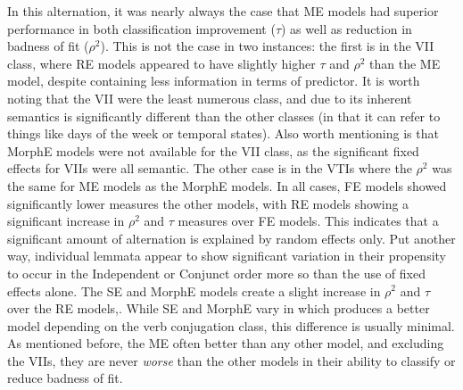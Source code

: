In this alternation, it was nearly always the case that ME models had superior performance in both classification improvement ($\tau$) as well as reduction in badness of fit ($\rho^{2}$). This is not the case in two instances: the first is in the VII class, where RE models appeared to have slightly higher $\tau$ and $\rho^{2}$ than the ME model, despite containing less information in terms of predictor. It is worth noting that the VII were the least numerous class, and due to its inherent semantics is significantly different than the other classes (in that it can refer to things like days of the week or temporal states). Also worth mentioning is that MorphE models were not available for the VII class, as the significant fixed effects for VIIs were all semantic. The other case is in the VTIs where the $\rho^{2}$ was the same for ME models as the MorphE models. In all cases, FE models showed significantly lower measures the other models, with RE models showing a significant increase in $\rho^{2}$ and $\tau$ measures over FE models. This indicates that a significant amount of alternation is explained by random effects only. Put another way, individual lemmata appear to show significant variation in their propensity to occur in the Independent or Conjunct order more so than the use of fixed effects alone. The SE and MorphE models create a slight increase in $\rho^{2}$ and $\tau$ over the RE models,. While SE and MorphE vary in which produces a better model depending on the verb conjugation class, this difference is usually minimal. As mentioned before, the ME often better than any other model, and excluding the VIIs, they are never \textit{worse} than the other models in their ability to classify or reduce badness of fit. 

